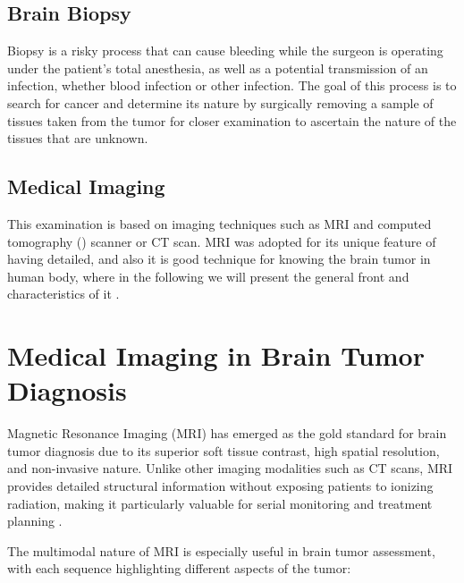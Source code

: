 \subsection{Brain Biopsy}
Biopsy is a risky process that can cause bleeding while the surgeon is operating under the patient's total anesthesia, as well as a potential transmission of an infection, whether blood infection or other infection. The goal of this process is to search for cancer and determine its nature by surgically removing a sample of tissues taken from the tumor for closer examination to ascertain the nature of the tissues that are unknown.

\subsection{Medical Imaging}
This examination is based on imaging techniques such as MRI and computed tomography () scanner or CT scan. MRI was adopted for its unique feature of having detailed, and also it is good technique for knowing the brain tumor in human body, where in the following we will present the general front and characteristics of it \cite{ref10}.


\section{Medical Imaging in Brain Tumor Diagnosis}

Magnetic Resonance Imaging (MRI) has emerged as the gold standard for brain tumor diagnosis due to its superior soft tissue contrast, high spatial resolution, and non-invasive nature. Unlike other imaging modalities such as CT scans, MRI provides detailed structural information without exposing patients to ionizing radiation, making it particularly valuable for serial monitoring and treatment planning \cite{Menze2015}.

The multimodal nature of MRI is especially useful in brain tumor assessment, with each sequence highlighting different aspects of the tumor:

